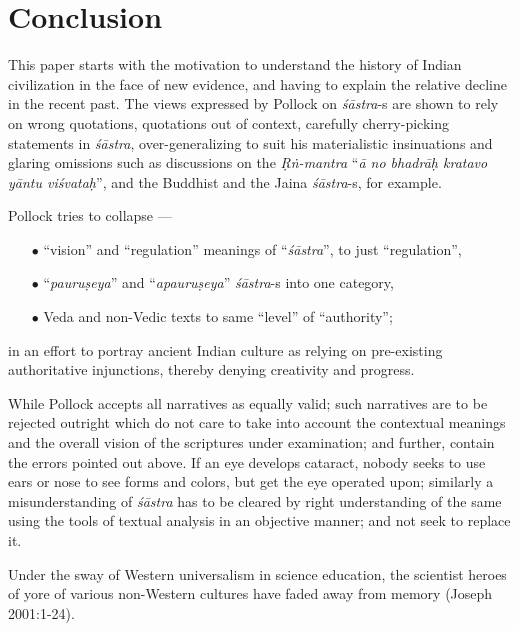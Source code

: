 \section{Conclusion}\label{art12-sec4}

This paper starts with the motivation to understand the history of Indian civilization in the face of new evidence, and having to explain the relative decline in the recent past. The views expressed by Pollock on {\sl śāstra}-s are shown to rely on wrong quotations, quotations out of context, carefully cherry-picking statements in {\sl śāstra}, over-generalizing to suit his materialistic insinuations and glaring omissions such as discussions on the {\sl Ṛṅ-mantra} ``{\sl ā no bhadrāḥ kratavo yāntu viśvataḥ}'', and the Buddhist and the Jaina {\sl śāstra}-s, for example.

Pollock tries to collapse ---
\begin{itemize}
\itemsep=1pt
\item[$\bullet$]  ``vision'' and ``regulation'' meanings of ``{\sl śāstra}'', to just ``regulation'',

\item[$\bullet$] ``{\sl pauruṣeya}'' and ``{\sl apauruṣeya}'' {\sl śāstra}-s into one category,

\item[$\bullet$] Veda and non-Vedic texts to same ``level'' of ``authority'';
\end{itemize}
in an effort to portray ancient Indian culture as relying on pre-existing authoritative injunctions, thereby denying creativity and progress.

While Pollock accepts all narratives as equally valid; such narratives are to be rejected outright which do not care to take into account the contextual meanings and the overall vision of the scriptures under examination; and further, contain the errors pointed out above. If an eye develops cataract, nobody seeks to use ears or nose to see forms and colors, but get the eye operated upon; similarly a misunderstanding of {\sl śāstra} has to be cleared by right understanding of the same using the tools of textual analysis in an objective manner; and not seek to replace it. 

Under the sway of Western universalism in science education, the scientist heroes of yore of various non-Western cultures have faded away from memory (Joseph 2001:1-24). 

